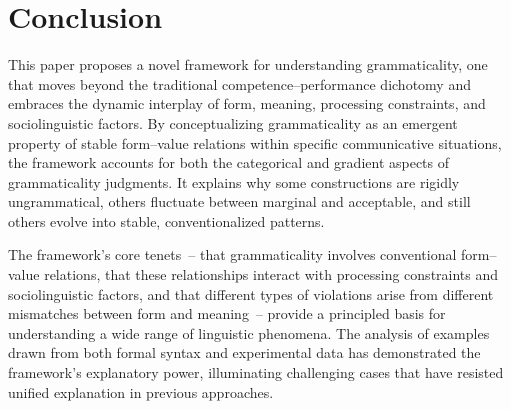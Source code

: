 \documentclass[12pt,letterpaper]{article}
\begin{document}



\section{Conclusion}

This paper proposes a novel framework for understanding grammaticality, one that moves beyond the traditional competence--performance dichotomy and embraces the dynamic interplay of form, meaning, processing constraints, and sociolinguistic factors. By conceptualizing grammaticality as an emergent property of stable form--value relations within specific communicative situations, the framework accounts for both the categorical and gradient aspects of grammaticality judgments. It explains why some constructions are rigidly ungrammatical, others fluctuate between marginal and acceptable, and still others evolve into stable, conventionalized patterns.

The framework's core tenets~-- that grammaticality involves conventional form--value relations, that these relationships interact with processing constraints and sociolinguistic factors, and that different types of violations arise from different mismatches between form and meaning~-- provide a principled basis for understanding a wide range of linguistic phenomena. The analysis of examples drawn from both formal syntax and experimental data has demonstrated the framework's explanatory power, illuminating challenging cases that have resisted unified explanation in previous approaches.
\end{document}

